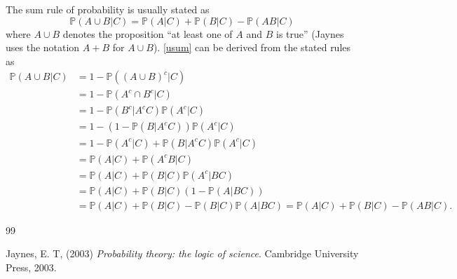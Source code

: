 \documentclass{scrartcl}
\renewcommand{\P}{{\mathbb P}}
\begin{document}
The sum rule of probability is usually stated as
\begin{equation}\label{usum}
  \P(A \cup B|C) = \P(A|C) + \P(B|C) - \P(A B|C)
\end{equation}
where $A \cup B$ denotes the proposition ``at least one of $A$ and $B$
is true'' (Jaynes uses the notation $A + B$ for $A \cup
B$). \eqref{usum} can be derived from the stated rules as 
\begin{align*}
  \P(A \cup B|C) &= 1 - \P((A\cup B)^c|C) \\
               &= 1 - \P(A^c \cap B^c|C) \\
               &= 1 - \P(B^c | A^cC) \P(A^c|C) \\
               &= 1 - \left(1 - \P(B|A^cC) \right) \P(A^c|C) \\
               &= 1 - \P(A^c|C) + \P(B|A^cC) \P(A^c|C) \\
               &= \P(A|C) + \P(A^c B|C) \\
               &= \P(A|C) + \P(B|C) \P(A^c | BC) \\
  &= \P(A|C) + \P(B|C) (1 - \P(A | BC)) \\ &= \P(A|C) + \P(B|C) -
                                             \P(B|C) \P(A|BC) =
                                             \P(A|C) + \P(B|C) - \P(A
                                             B|C). 
\end{align*}


\begin{thebibliography}{99}

  

      Jaynes, E. T, (2003)
  \textit{Probability theory: the logic of science}. Cambridge
  University Press, 2003.







  \end{thebibliography}
\end{document}
